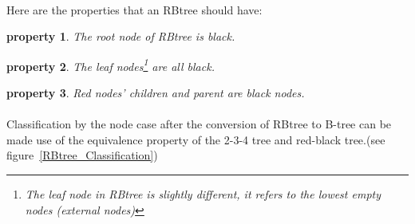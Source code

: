 \documentclass{article}
\newtheorem{property}{property}[section]
\begin{document}
\paragraph{}
Here are the properties that an RBtree should have:

\begin{property}
    The root node of RBtree is black.
\end{property}

\begin{property}
    The leaf nodes\footnote{The leaf node in RBtree is slightly different, it refers to the lowest empty nodes (external nodes)}
    are all black.
\end{property}

\begin{property}\label{RBt_property}
    Red nodes' children and parent are black nodes.
\end{property}

\paragraph{}
Classification by the node case after the conversion of RBtree to B-tree can be made use of the equivalence property of the 2-3-4 tree and red-black tree.(see figure~\ref{RBtree_Classification})
\end{document}
